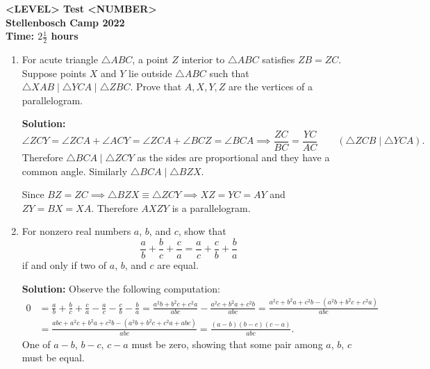\documentclass{article}
\begin{document}
\thispagestyle{empty}

\begin{center}
  \textbf{\Large <LEVEL> Test <NUMBER>}
  \\ \vspace{1em}
  \textbf{\large Stellenbosch Camp 2022}
  \\ \vspace{1em}
  \textbf{\large Time: $2\frac{1}{2}$ hours}
\end{center}

\bigskip

\begin{enumerate}[itemsep=24pt]

\item 
For acute triangle $\triangle ABC$, a point $Z$ interior to $\triangle ABC$ satisfies $ZB = ZC$.
Suppose points $X$ and $Y$ lie outside $\triangle ABC$ such that $\triangle XAB \mathop{|||} \triangle YCA \mathop{|||} \triangle ZBC$.
Prove that $A,X,Y,Z$ are the vertices of a parallelogram. 

\textbf{Solution:}
$$\angle ZCY = \angle ZCA + \angle ACY = \angle ZCA + \angle BCZ = \angle BCA \implies \frac{ZC}{BC} = \frac{YC}{AC} \qquad (\triangle ZCB \mathop{|||} \triangle YCA).$$
Therefore $\triangle BCA \mathop{|||} \triangle ZCY$ as the sides are proportional and they have a common angle. Similarly $\triangle BCA \mathop{|||} \triangle BZX$. 

Since $BZ = ZC \implies \triangle BZX \equiv \triangle ZCY \implies XZ = YC = AY$ and $ZY = BX = XA$.
Therefore $AXZY$ is a parallelogram.


\item %
For nonzero real numbers $a$, $b$, and $c$, show that
\[ \frac{a}{b} +\frac{b}{c} +\frac{c}{a} = \frac{a}{c} +\frac{c}{b} +\frac{b}{a} \]
if and only if two of $a$, $b$, and $c$ are equal.

\textbf{Solution:} Observe the following computation:
\begin{align*}
  0 &= \frac{a}{b} +\frac{b}{c} +\frac{c}{a} -\frac{a}{c} -\frac{c}{b} -\frac{b}{a} = \frac{a^{2}b + b^{2}c + c^{2}a}{abc} -\frac{a^{2}c + b^{2}a + c^{2}b}{abc} = \frac{a^{2}c + b^{2}a + c^{2}b -(a^{2}b + b^{2}c + c^{2}a)}{abc} \\
  &= \frac{abc + a^{2}c + b^{2}a + c^{2}b - (a^{2}b + b^{2}c + c^{2}a+abc)}{abc} = \frac{(a-b)(b-c)(c-a)}{abc}.
\end{align*}
One of $a-b$, $b-c$, $c-a$ must be zero, showing that some pair among $a$, $b$, $c$ must be equal.



\end{enumerate}
\end{document}
